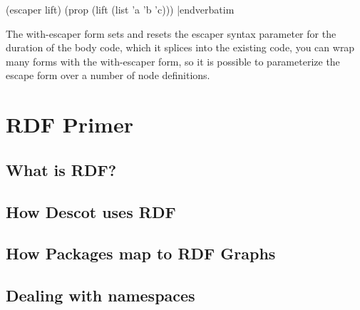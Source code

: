 \medskip\verbatim
(escaper lift)
(prop (lift (list 'a 'b 'c)))
|endverbatim
\medskip

\noindent
The with-escaper form sets and resets the escaper syntax parameter
for the duration of the body code, which it splices into the existing 
code, you can wrap many forms with the with-escaper form, so it is 
possible to parameterize the escape form over a number of node definitions.

\chapter{RDF Primer}{}%
\section{What is RDF?}{}%
\section{How Descot uses RDF}{}%
\section{How Packages map to RDF Graphs}{}%
\section{Dealing with namespaces}{}%


\bye
